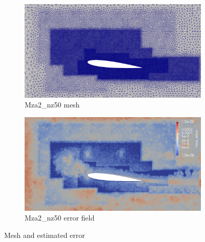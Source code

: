 \begin{figure}[H]
	
	\begin{subfigure}[b]{0.475\textwidth}
		\centering
		\includegraphics[width=1\textwidth]{figures/zonal_adapt_results/Mesh_and_error_plots_Re200k/Mza2_inplane.png}
		\caption{Mza2\_nz50 mesh}
		\label{fig:zonal_Mza2_mesh_Re200k}
	\end{subfigure}
	\begin{subfigure}[b]{0.475\textwidth}
		\centering
		\includegraphics[width=1\textwidth]{figures/zonal_adapt_results/Mesh_and_error_plots_Re200k/Mza2_error.png}
		\caption{Mza2\_nz50 error field}
		\label{fig:zonal_Mza2_error_Re200k}
	\end{subfigure}
	
	\caption{Mesh and estimated error}
    \label{fig:adapted_meshes_200k}
\end{figure}